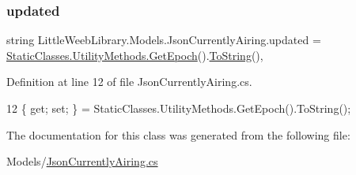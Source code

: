 \subsubsection{\texorpdfstring{updated}{updated}}
{\footnotesize\ttfamily string Little\+Weeb\+Library.\+Models.\+Json\+Currently\+Airing.\+updated = \mbox{\hyperlink{class_little_weeb_library_1_1_static_classes_1_1_utility_methods_a12336d9e64983ddabaad8950486fafb2}{Static\+Classes.\+Utility\+Methods.\+Get\+Epoch}}().\mbox{\hyperlink{class_little_weeb_library_1_1_models_1_1_json_currently_airing_a330c337c9e0ddf2866a9a102ae0e9880}{To\+String}}()\hspace{0.3cm}{\ttfamily [get]}, {\ttfamily [set]}}



Definition at line 12 of file Json\+Currently\+Airing.\+cs.


\begin{DoxyCode}
12 \{ \textcolor{keyword}{get}; \textcolor{keyword}{set}; \} = StaticClasses.UtilityMethods.GetEpoch().ToString();
\end{DoxyCode}


The documentation for this class was generated from the following file\+:\begin{DoxyCompactItemize}
\item 
Models/\mbox{\hyperlink{_json_currently_airing_8cs}{Json\+Currently\+Airing.\+cs}}\end{DoxyCompactItemize}
